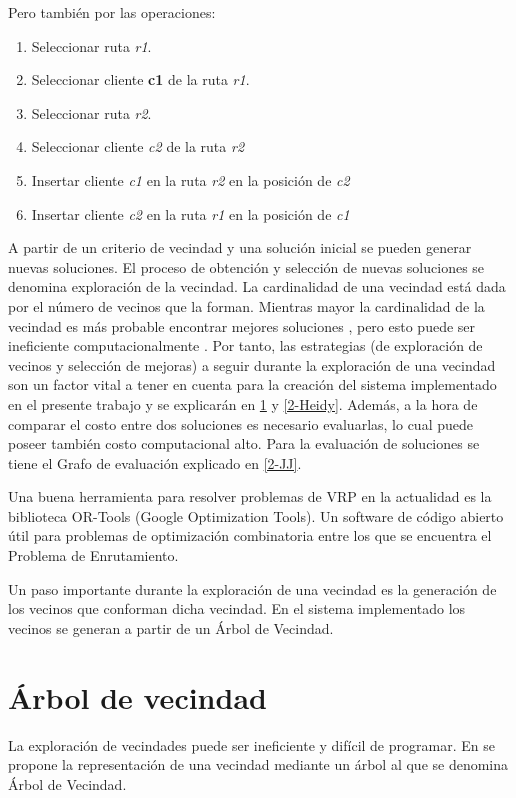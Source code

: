 Pero también por las operaciones:

\begin{enumerate}
	\item Seleccionar ruta \textit{r1}.
	\item Seleccionar cliente \textbf{c1} de la ruta \textit{r1}.
	\item Seleccionar ruta \textit{r2}.
	\item Seleccionar cliente \textit{c2} de la ruta \textit{r2}
	\item Insertar cliente \textit{c1} en la ruta \textit{r2} en la posición de \textit{c2}
	\item Insertar cliente \textit{c2} en la ruta \textit{r1} en la posición de \textit{c1}
\end{enumerate}


A partir de un criterio de vecindad y una solución inicial se pueden generar nuevas soluciones. El proceso de obtención y selección de nuevas soluciones se denomina exploración de la vecindad. La cardinalidad de una vecindad está dada por el número de vecinos que la forman. Mientras mayor la cardinalidad de la vecindad es más probable encontrar mejores soluciones \cite{TODO}, pero esto puede ser ineficiente computacionalmente \cite{TODO}. Por tanto, las estrategias (de exploración de vecinos y selección de mejoras) a seguir durante la exploración de una vecindad son un factor vital a tener en cuenta para la creación del sistema implementado en el presente trabajo y se explicarán en \ref{2-Hector} y \ref{2-Heidy}. Además, a la hora de comparar el costo entre dos soluciones es necesario evaluarlas, lo cual puede poseer también costo computacional alto. Para la evaluación de soluciones se tiene el Grafo de evaluación explicado en \ref{2-JJ}. 

Una buena herramienta para resolver problemas de VRP en la actualidad es la biblioteca OR-Tools (Google Optimization Tools)\cite{TODO}. Un software de código abierto útil para problemas de optimización combinatoria entre los que se encuentra el Problema de Enrutamiento. 

Un paso importante durante la exploración de una vecindad es la generación de los vecinos que conforman dicha vecindad. En el sistema implementado los vecinos se generan a partir de un Árbol de Vecindad.

\section{Árbol de vecindad}\label{2-Hector}
La exploración de vecindades puede ser ineficiente y difícil de programar. En \cite{Hector} se propone la representación de una vecindad mediante un árbol al que se denomina Árbol de Vecindad.

